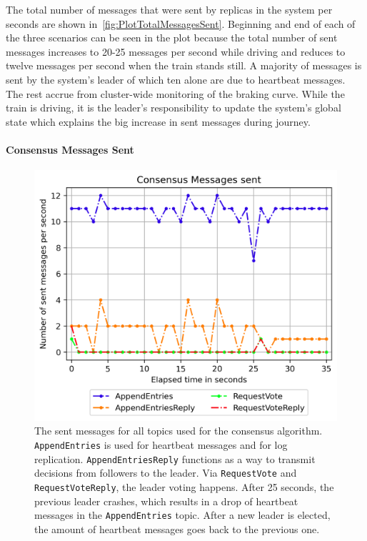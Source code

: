 The total number of messages that were sent by replicas in the system per seconds are shown in~\autoref{fig:PlotTotalMessagesSent}.
Beginning and end of each of the three scenarios can be seen in the plot because the total number of sent messages increases to 20-25 messages per second while driving and reduces to twelve messages per second when the train stands still.
A majority of messages is sent by the system's leader of which ten alone are due to heartbeat messages.
The rest accrue from cluster-wide monitoring of the braking curve.
While the train is driving, it is the leader's responsibility to update the system's global state which explains the big increase in sent messages during journey.

\paragraph{Consensus Messages Sent}

\begin{figure}[!hb]
	\centering
	\includegraphics[width=0.75\linewidth]{images/plots/ConsensusMessagesSent}
	\caption{The sent messages for all topics used for the consensus algorithm. \texttt{AppendEntries} is used for heartbeat messages and for log replication. \texttt{AppendEntriesReply} functions as a way to transmit decisions from followers to the leader. Via \texttt{RequestVote} and \texttt{RequestVoteReply}, the leader voting happens. After 25 seconds, the previous leader crashes, which results in a drop of heartbeat messages in the \texttt{AppendEntries} topic. After a new leader is elected, the amount of heartbeat messages goes back to the previous one.}
	\label{fig:PlotConsensusMessagesSent}
\end{figure}

